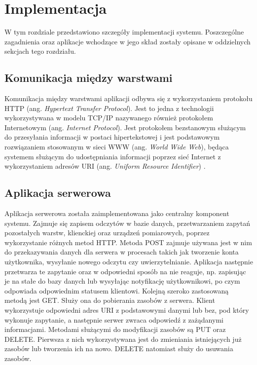 \chapter{Implementacja}
W tym rozdziale przedstawiono szczegóły implementacji systemu. 
Poszczególne zagadnienia oraz aplikacje wchodzące w jego skład
zostały opisane w oddzielnych sekcjach tego rozdziału.

\section{Komunikacja między warstwami}
Komunikacja między warstwami aplikacji odbywa się z wykorzystaniem protokołu 
HTTP (ang. \textit{Hypertext Transfer Protocol}).
Jest to jedna z technologii wykorzystywana w modelu TCP/IP 
nazywanego również protokołem Internetowym (ang. \textit{Internet Protocol}).
Jest protokołem bezstanowym \cite{http:rfc9110} służącym do przesyłania
informacji w postaci hipertekstowej i jest podstawowym rozwiązaniem
stosowanym w sieci WWW (ang. \textit{World Wide Web}), będąca systemem 
służącym do udostępniania informacji poprzez sieć Internet
z wykorzystaniem adresów URI (ang. \textit{Uniform Resource Identifier}) \cite{Jacobs:04:AWW}.

\section{Aplikacja serwerowa}
Aplikacja serwerowa została zaimplementowana jako centralny komponent systemu.
Zajmuje się zapisem odczytów w bazie danych, przetwarzaniem zapytań
pozostałych warstw, klienckiej oraz urządzeń pomiarowych,
poprzez wykorzystanie różnych metod HTTP.
Metoda POST zajmuje używana jest w nim do przekazywania danych
dla serwera w procesach takich jak tworzenie konta użytkownika,
wysyłanie nowego odczytu czy uwierzytelnianie.
Aplikacja następnie przetwarza te zapytanie oraz w odpowiedni 
sposób na nie reaguje, np. zapisując je na stałe do bazy danych 
lub wysyłając notyfikację użytkownikowi, po czym odpowiada
odpowiednim statusem klientowi.
Kolejną szeroko zastosowaną metodą jest GET. Służy ona do pobierania
zasobów z serwera. Klient wykorzystuje odpowiedni adres URI z
podstawowymi danymi lub bez, pod który wykonuje zapytanie, a
następnie serwer zwraca odpowiedź z zażądanymi informacjami.
Metodami służącymi do modyfikacji zasobów są PUT oraz DELETE.
Pierwsza z nich wykorzystywana jest do zmieniania istniejących
już zasobów lub tworzenia ich na nowo. DELETE natomiast służy
do usuwania zasobów.

